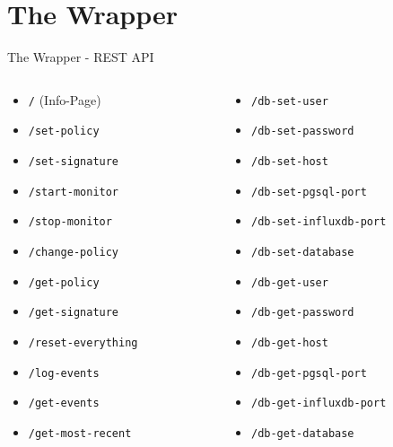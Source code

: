 \section{The Wrapper}

\begin{frame}[fragile]{The Wrapper - REST API}
    \begin{columns}
        \begin{column}{0.5\textwidth}
            \begin{itemize}
                \item \texttt{/} (Info-Page)
                \item \texttt{/set-policy}
                \item \texttt{/set-signature}
                \item \texttt{/start-monitor}
                \item \texttt{/stop-monitor}
                \item \texttt{/change-policy}
                \item \texttt{/get-policy} 
                \item \texttt{/get-signature}
                \item \texttt{/reset-everything}
                \item \texttt{/log-events}
                \item \texttt{/get-events}
                \item \texttt{/get-most-recent}
            \end{itemize}
        \end{column}
        \begin{column}{0.5\textwidth}
            \begin{itemize}
                \item \texttt{/db-set-user}
                \item \texttt{/db-set-password}
                \item \texttt{/db-set-host}
                \item \texttt{/db-set-pgsql-port}
                \item \texttt{/db-set-influxdb-port}
                \item \texttt{/db-set-database}
                \item \texttt{/db-get-user}
                \item \texttt{/db-get-password}
                \item \texttt{/db-get-host}
                \item \texttt{/db-get-pgsql-port}
                \item \texttt{/db-get-influxdb-port}
                \item \texttt{/db-get-database}
            \end{itemize}
        \end{column}
    \end{columns}
\end{frame}


